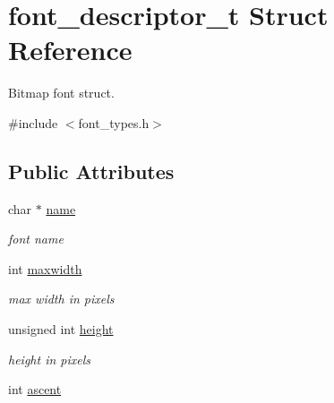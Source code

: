 \hypertarget{structfont__descriptor__t}{}\section{font\+\_\+descriptor\+\_\+t Struct Reference}
\label{structfont__descriptor__t}


Bitmap font struct.  




{\ttfamily \#include $<$font\+\_\+types.\+h$>$}

\subsection*{Public Attributes}
\begin{DoxyCompactItemize}
\item 
\mbox{\label{structfont__descriptor__t_a7a5f7569c87f8995fe45b207897a0327}} 
char $\ast$ \mbox{\hyperlink{structfont__descriptor__t_a7a5f7569c87f8995fe45b207897a0327}{name}}
\begin{DoxyCompactList}\small\item\em font name \end{DoxyCompactList}\item 
\mbox{\label{structfont__descriptor__t_a8e21a73982523c96f1ca5f39487956a7}} 
int \mbox{\hyperlink{structfont__descriptor__t_a8e21a73982523c96f1ca5f39487956a7}{maxwidth}}
\begin{DoxyCompactList}\small\item\em max width in pixels \end{DoxyCompactList}\item 
\mbox{\label{structfont__descriptor__t_abf7d9548e4312aa8ab0b6c868c5c4ae3}} 
unsigned int \mbox{\hyperlink{structfont__descriptor__t_abf7d9548e4312aa8ab0b6c868c5c4ae3}{height}}
\begin{DoxyCompactList}\small\item\em height in pixels \end{DoxyCompactList}\item 
\mbox{\label{structfont__descriptor__t_af23bcc2d3e1633f8153cb92df31de704}} 
int \mbox{\hyperlink{structfont__descriptor__t_af23bcc2d3e1633f8153cb92df31de704}{ascent}}

\end{DoxyCompactItemize}

